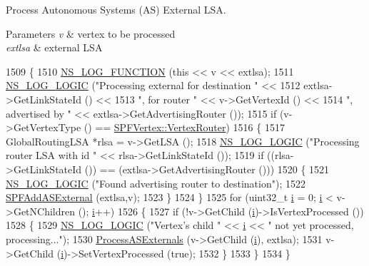 Process Autonomous Systems (AS) External L\+SA. 


\begin{DoxyParams}{Parameters}
{\em v} & vertex to be processed \\
\hline
{\em extlsa} & external L\+SA \\
\hline
\end{DoxyParams}

\begin{DoxyCode}
1509 \{
1510   \hyperlink{log-macros-disabled_8h_a90b90d5bad1f39cb1b64923ea94c0761}{NS\_LOG\_FUNCTION} (\textcolor{keyword}{this} << v << extlsa);
1511   \hyperlink{group__logging_ga88acd260151caf2db9c0fc84997f45ce}{NS\_LOG\_LOGIC} (\textcolor{stringliteral}{"Processing external for destination "} << 
1512                 extlsa->GetLinkStateId () <<
1513                 \textcolor{stringliteral}{", for router "}  << v->GetVertexId () <<
1514                 \textcolor{stringliteral}{", advertised by "} << extlsa->GetAdvertisingRouter ());
1515   \textcolor{keywordflow}{if} (v->GetVertexType () == \hyperlink{classns3_1_1SPFVertex_a20f8a4cfc99a1b7ecd10a23151b93afda340822983a2833fff14de88ea20a3f31}{SPFVertex::VertexRouter})
1516     \{
1517       GlobalRoutingLSA *rlsa = v->GetLSA ();
1518       \hyperlink{group__logging_ga88acd260151caf2db9c0fc84997f45ce}{NS\_LOG\_LOGIC} (\textcolor{stringliteral}{"Processing router LSA with id "} << rlsa->GetLinkStateId ());
1519       \textcolor{keywordflow}{if} ((rlsa->GetLinkStateId ()) == (extlsa->GetAdvertisingRouter ()))
1520         \{
1521           \hyperlink{group__logging_ga88acd260151caf2db9c0fc84997f45ce}{NS\_LOG\_LOGIC} (\textcolor{stringliteral}{"Found advertising router to destination"});
1522           \hyperlink{classns3_1_1GlobalRouteManagerImpl_a0ccd93a5b90948571d2b762d4219c65d}{SPFAddASExternal} (extlsa,v);
1523         \}
1524     \}
1525   \textcolor{keywordflow}{for} (uint32\_t \hyperlink{bernuolliDistribution_8m_a6f6ccfcf58b31cb6412107d9d5281426}{i} = 0; \hyperlink{bernuolliDistribution_8m_a6f6ccfcf58b31cb6412107d9d5281426}{i} < v->GetNChildren (); \hyperlink{bernuolliDistribution_8m_a6f6ccfcf58b31cb6412107d9d5281426}{i}++)
1526     \{
1527       \textcolor{keywordflow}{if} (!v->GetChild (\hyperlink{bernuolliDistribution_8m_a6f6ccfcf58b31cb6412107d9d5281426}{i})->IsVertexProcessed ())
1528         \{
1529           \hyperlink{group__logging_ga88acd260151caf2db9c0fc84997f45ce}{NS\_LOG\_LOGIC} (\textcolor{stringliteral}{"Vertex's child "} << \hyperlink{bernuolliDistribution_8m_a6f6ccfcf58b31cb6412107d9d5281426}{i} << \textcolor{stringliteral}{" not yet processed, processing..."});
1530           \hyperlink{classns3_1_1GlobalRouteManagerImpl_a1b3aa701b33156b04d351f33e3ebdcb4}{ProcessASExternals} (v->GetChild (\hyperlink{bernuolliDistribution_8m_a6f6ccfcf58b31cb6412107d9d5281426}{i}), extlsa);
1531           v->GetChild (\hyperlink{bernuolliDistribution_8m_a6f6ccfcf58b31cb6412107d9d5281426}{i})->SetVertexProcessed (\textcolor{keyword}{true});
1532         \}
1533     \}
1534 \}
\end{DoxyCode}


